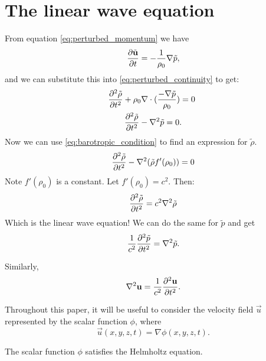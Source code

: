 \section{The linear wave equation}\label{ss:lin_wave_eq}
From equation \eqref{eq:perturbed_momentum} we have
\begin{equation*}
    \frac{\partial \tilde{\mathbf{u}}}{\partial t} = - \frac{1}{\rho_0} \nabla \tilde{p},
\end{equation*}
and we can substitute this into \eqref{eq:perturbed_continuity} to get:
\begin{gather*}
    \frac{\partial ^2 \tilde{\rho}}{\partial t^2}
    + \rho_0 \nabla \cdot ( \frac{- \nabla \tilde{p}}{\rho_0}) = 0 ~ \\ \frac{\partial ^2 \tilde{\rho}}{\partial t^2}
    - \nabla^2  \tilde{p} = 0.
\end{gather*}
Now we can use \ref{eq:barotropic_condition} to find an expression for $\tilde{\rho}$.
\begin{equation*}
    \frac{\partial ^2 \tilde{\rho}}{\partial t^2} - \nabla^2 (\tilde{\rho} f'(\rho_0)) = 0
\end{equation*}
Note $f'(\rho_0)$ is a constant. Let $f'(\rho_0) = c^2$. Then:
\begin{equation}
    \frac{\partial ^2 \tilde{\rho}}{\partial t^2} = c^2 \nabla^2 \tilde{\rho}
\end{equation}
Which is the linear wave equation! We can do the same for $\tilde{p}$ and get
    \begin{equation}
        \frac{1}{c^2}\frac{\partial ^2 \tilde{p}}{\partial t^2} = \nabla^2 \tilde{p}.
    \end{equation}\par
%
Similarly,
    \begin{equation}
        \nabla^2 \mathbf{u} = \frac{1}{c^2} \frac{\partial ^2 \mathbf{u}}{\partial t^2}.
    \end{equation} \par
%
Throughout this paper, it will be useful to consider the velocity field $\vec{u}$ represented by the scalar function $\phi$, where
    \begin{equation}
        \vec{u}(x, y, z, t) = \nabla \phi(x, y, z, t).
    \end{equation}\par
%
    \begin{propn} The scalar function $\phi$ satisfies the Helmholtz equation.
    \end{propn}
